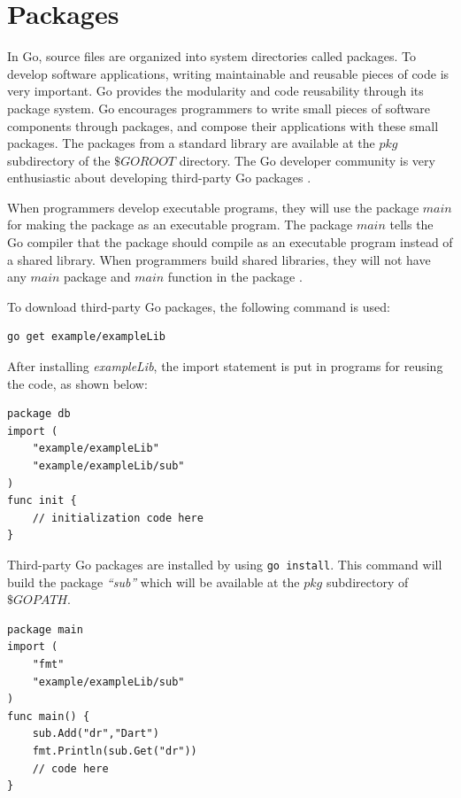 \documentclass[
  oneside, 12pt, 
  printed, %
  notable,   %
  nolof,     %
  nolot,     %
]{fithesis3}
\begin{document}

\section{Packages}
In Go, source files are organized into system directories called packages. To  develop 
software applications, writing maintainable and reusable pieces of code is very important. Go 
provides the modularity and code reusability through its package system. Go encourages 
programmers to write small pieces of software components through packages, and compose their  
applications with these small packages. The packages from a standard library are available at the $pkg$ subdirectory of the $\$GOROOT$ directory. The Go developer community is very enthusiastic about developing third-party Go packages \cite{stack_2014}.

When programmers develop executable programs, they will use the package $main$ for making the 
package as an executable program. The package $main$ tells the Go compiler that the package 
should compile as an executable program instead of a shared library. When programmers build 
shared libraries, they will not have any $main$ package and $main$ function in the package \cite{stack_2014}.

To download third-party Go packages, the following command is used: 
\begin{lstlisting}
go get example/exampleLib
\end{lstlisting}
After installing \textit{exampleLib}, the import statement is put in programs for reusing the 
code, as shown below:
\begin{lstlisting}
package db
import (
	"example/exampleLib"
	"example/exampleLib/sub"
)
func init {
	// initialization code here    
}
\end{lstlisting}
Third-party Go packages are installed by using \texttt{go install}. This command will build the package \textit{“sub”} which will be available at the $pkg$ subdirectory of $\$GOPATH$.
\begin{lstlisting}
package main
import (
	"fmt"
	"example/exampleLib/sub"
)
func main() {
    sub.Add("dr","Dart")
    fmt.Println(sub.Get("dr"))
    // code here    
}
\end{lstlisting}
\end{document}

